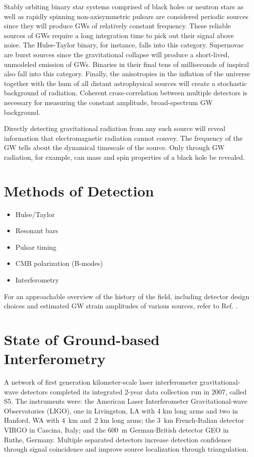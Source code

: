 Stably orbiting binary star systems comprised of black holes or
neutron stars as well as rapidly spinning non-axisymmetric pulsars are
considered periodic sources since they will produce GWs
of relatively constant frequency. These reliable sources of GWs
require a long integration time to pick out their signal above
noise. The Hulse-Taylor binary, for instance, falls into this
category. Supernovae are burst sources since the gravitational
collapse will produce a short-lived, unmodeled emission of
GWs. Binaries in their final tens of milliseconds of inspiral also
fall into this category. Finally, the anisotropies in the inflation of
the universe together with the hum of all distant astrophysical
sources will create a stochastic background of radiation. Coherent
cross-correlation between multiple detectors is necessary for
measuring the constant amplitude, broad-spectrum GW background.

Directly detecting gravitational radiation from any such source will
reveal information that electromagnetic radiation cannot convey. The
frequency of the GW tells about the dynamical timescale of the
source. Only through GW radiation, for example, can mass and spin
properties of a black hole be revealed.





\section{Methods of Detection}
\begin{itemize}
\item Hulse/Taylor
\item Resonant bars
\item Pulsar timing
\item CMB polarization (B-modes)
\item Interferometry
\end{itemize}
For an approachable overview of the history of the field, including
detector design choices and estimated GW strain amplitudes of various
sources, refer to Ref. \cite{Linsay1983Study}.






\section{State of Ground-based Interferometry}
A network of first generation kilometer-scale laser interferometer
gravitational-wave detectors completed its integrated 2-year data
collection run in 2007, called S5. The instruments were: the American
Laser Interferometer Gravitational-wave Observatories (LIGO)\cite{Abbott2009LIGO},
one in Livingston, LA with 4 km long arms and two in Hanford, WA with
4~km and~2 km long arms; the 3~km French-Italian detector
VIRGO\cite{Acernese2008Virgo} in Cascina, Italy; and the 600~m
German-British detector GEO\cite{Luck2006Status} in Ruthe, Germany. Multiple
separated detectors increase detection confidence through signal
coincidence and improve source localization through triangulation.

